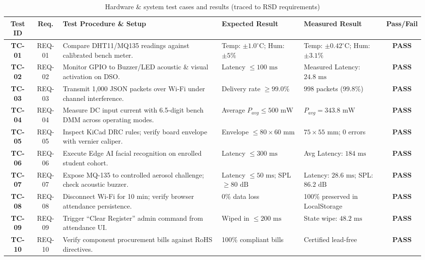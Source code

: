 \documentclass[11pt,a4paper]{article}
\begin{document}
\begin{table}[h!]
\centering
\caption{Hardware \& system test cases and results (traced to RSD requirements)}
\begin{tabular}{|c|c|p{5cm}|p{3.2cm}|p{3.2cm}|c|}
\hline
\textbf{Test ID} & \textbf{Req.} & \textbf{Test Procedure \& Setup} & \textbf{Expected Result} & \textbf{Measured Result} & \textbf{Pass/Fail} \\ \hline
\textbf{TC-01} & REQ-01 & Compare DHT11/MQ135 readings against calibrated bench meter. & Temp: $\pm 1.0^\circ\text{C}$; Hum: $\pm 5\%$ & Temp: $\pm 0.42^\circ\text{C}$; Hum: $\pm 3.1\%$ & \textbf{PASS} \\ \hline
\textbf{TC-02} & REQ-02 & Monitor GPIO to Buzzer/LED acoustic \& visual activation on DSO. & Latency $\le 100\text{ ms}$ & Measured Latency: $24.8\text{ ms}$ & \textbf{PASS} \\ \hline
\textbf{TC-03} & REQ-03 & Transmit 1,000 JSON packets over Wi-Fi under channel interference. & Delivery rate $\ge 99.0\%$ & 998 packets ($99.8\%$) & \textbf{PASS} \\ \hline
\textbf{TC-04} & REQ-04 & Measure DC input current with 6.5-digit bench DMM across operating modes. & Average $P_{avg} \le 500\text{ mW}$ & $P_{avg} = 343.8\text{ mW}$ & \textbf{PASS} \\ \hline
\textbf{TC-05} & REQ-05 & Inspect KiCad DRC rules; verify board envelope with vernier caliper. & Envelope $\le 80 \times 60\text{ mm}$ & $75 \times 55\text{ mm}$; 0 errors & \textbf{PASS} \\ \hline
\textbf{TC-06} & REQ-06 & Execute Edge AI facial recognition on enrolled student cohort. & Latency $\le 300\text{ ms}$ & Avg Latency: $184\text{ ms}$ & \textbf{PASS} \\ \hline
\textbf{TC-07} & REQ-07 & Expose MQ-135 to controlled aerosol challenge; check acoustic buzzer. & Latency $\le 50\text{ ms}$; SPL $\ge 80\text{ dB}$ & Latency: $28.6\text{ ms}$; SPL: $86.2\text{ dB}$ & \textbf{PASS} \\ \hline
\textbf{TC-08} & REQ-08 & Disconnect Wi-Fi for 10 min; verify browser attendance persistence. & 0\% data loss & 100\% preserved in LocalStorage & \textbf{PASS} \\ \hline
\textbf{TC-09} & REQ-09 & Trigger ``Clear Register'' admin command from attendance UI. & Wiped in $\le 200\text{ ms}$ & State wipe: $48.2\text{ ms}$ & \textbf{PASS} \\ \hline
\textbf{TC-10} & REQ-10 & Verify component procurement bills against RoHS directives. & 100\% compliant bills & Certified lead-free & \textbf{PASS} \\ \hline
\end{tabular}
\end{table}
\end{document}
